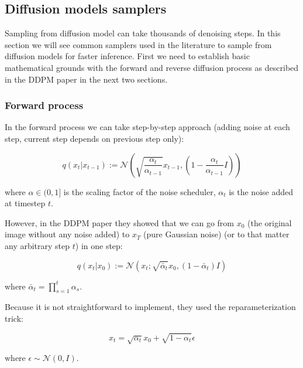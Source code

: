 \subsection{Diffusion models samplers}
\label{appendix:dm_samplers}

Sampling from diffusion model can take thousands of denoising steps. In this section we will see common samplers used in the literature to sample from diffusion models for faster inference. First we need to establish basic mathematical grounds with the forward and reverse diffusion process as described in the DDPM paper \cite{ddpm} in the next two sections.








\subsubsection*{Forward process}

In the forward process we can take step-by-step approach (adding noise at each step, current step depends on previous step only):

\[ q(x_t | x_{t-1}) := \mathcal{N} \left( \sqrt{\frac{\alpha_t}{\alpha_{t-1}}} x_{t-1}, \left( 1 - \frac{\alpha_t}{\alpha_{t-1}} I \right) \right) \]

where $\alpha \in (0, 1]$ is the scaling factor of the noise scheduler, $\alpha_t$ is the noise added at timestep $t$.

However, in the DDPM paper \cite{ddpm} they showed that we can go from $x_0$ (the original image without any noise added) to $x_T$ (pure Gaussian noise) (or to that matter any arbitrary step $t$) in one step:

\[ q(x_t | x_0) := \mathcal{N} \left( x_t; \sqrt{\bar{\alpha}_t} x_0, (1 - \bar{\alpha}_t) I \right) \]

where $\bar{\alpha}_t = \prod_{s=1}^{t} \alpha_s$.

Because it is not straightforward to implement, they used the reparameterization trick:

\begin{equation}
    x_t = \sqrt{\alpha_t} x_0 + \sqrt{1 - \alpha_t} \epsilon
    \label{eq:appendix_ddpm_reparam_trick}
\end{equation}

where $\epsilon \sim \mathcal{N} (0, I)$. 








